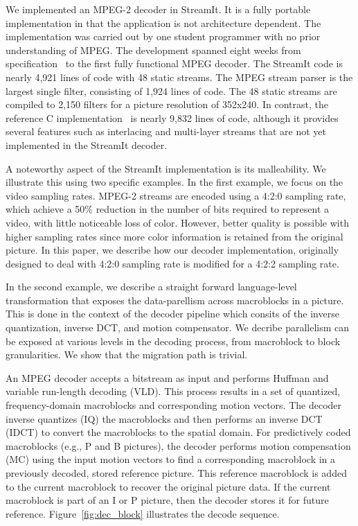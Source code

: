 
We implemented an MPEG-2 decoder in StreamIt. It is a fully portable
implementation in that the application is not architecture
dependent. The implementation was carried out by one student
programmer with no prior understanding of MPEG. The development
spanned eight weeks from specification~\cite{MPEG2} to the first fully
functional MPEG decoder. The StreamIt code is nearly 4,921 lines of
code with 48 static streams. The MPEG stream parser is the largest
single filter, consisting of 1,924 lines of code.  The 48 static
streams are compiled to 2,150 filters for a picture resolution of
352x240. In contrast, the reference C
implementation~\cite{reference-mpeg-c} is nearly 9,832 lines of code,
although it provides several features such as interlacing and
multi-layer streams that are not yet implemented in the StreamIt
decoder.

A noteworthy aspect of the StreamIt implementation is its
malleability. We illustrate this using two specific examples. 
In the first example, we focus on the video sampling rates. MPEG-2
streams are encoded using a 4:2:0 sampling rate, which achieve a 50\%
reduction in the number of bits required to represent a video, with
little noticeable loss of color. However, better quality is possible
with higher sampling rates since more color information is retained
from the original picture. In this paper, we describe how our
decoder implementation, originally designed to deal with 4:2:0
sampling rate is modified for a 4:2:2 sampling rate.

In the second example, we describe a straight forward language-level
transformation that exposes the data-parellism across macroblocks in a
picture. This is done in the context of the decoder pipeline which
consits of the inverse quantization, inverse DCT, and motion
compensator. We decribe parallelism can be exposed at various levels
in the decoding process, from macroblock to block granularities. We
show that the migration path is trivial.




An MPEG decoder accepts a bitstream as input and performs Huffman and
variable run-length decoding (VLD).  This process results in a set of
quantized, frequency-domain macroblocks and corresponding motion
vectors.  The decoder inverse quantizes (IQ) the macroblocks and then
performs an inverse DCT (IDCT) to convert the macroblocks to the
spatial domain.  For predictively coded macroblocks (e.g., P and B
pictures), the decoder performs motion compensation (MC) using the
input motion vectors to find a corresponding macroblock in a
previously decoded, stored reference picture. This reference
macroblock is added to the current macroblock to recover the original
picture data. If the current macroblock is part of an I or P picture,
then the decoder stores it for future reference.
Figure~\ref{fig:dec_block} illustrates the decode sequence.

